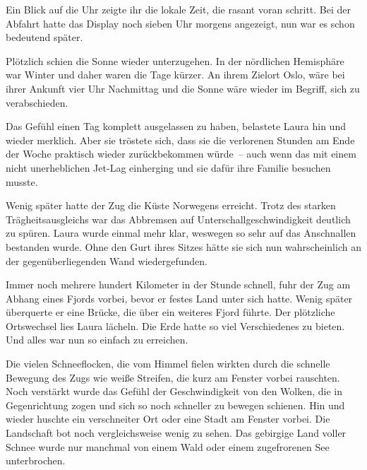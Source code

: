 \par

Ein Blick auf die Uhr zeigte ihr die lokale Zeit, die rasant voran schritt. Bei der Abfahrt hatte das Display noch sieben Uhr morgens angezeigt, nun war es schon bedeutend später.

\par

Plötzlich schien die Sonne wieder unterzugehen. In der nördlichen Hemisphäre war Winter und daher waren die Tage kürzer. An ihrem Zielort Oslo, wäre bei ihrer Ankunft vier Uhr Nachmittag und die Sonne wäre wieder im Begriff, sich zu verabschieden.

\par

Das Gefühl einen Tag komplett ausgelassen zu haben, belastete Laura hin und wieder merklich. Aber sie tröstete sich, dass sie die verlorenen Stunden am Ende der Woche praktisch wieder zurückbekommen würde~-- auch wenn das mit einem nicht unerheblichen Jet-Lag einherging und sie dafür ihre Familie besuchen musste.

\par

Wenig später hatte der Zug die Küste Norwegens erreicht. Trotz des starken Trägheitsausgleichs war das Abbremsen auf Unterschallgeschwindigkeit deutlich zu spüren. Laura wurde einmal mehr klar, weswegen so sehr auf das Anschnallen bestanden wurde. Ohne den Gurt ihres Sitzes hätte sie sich nun wahrscheinlich an der gegenüberliegenden Wand wiedergefunden.

\par

Immer noch mehrere hundert Kilometer in der Stunde schnell, fuhr der Zug am Abhang eines Fjords vorbei, bevor er festes Land unter sich hatte. Wenig später überquerte er eine Brücke, die über ein weiteres Fjord führte. Der plötzliche Ortswechsel lies Laura lächeln. Die Erde hatte so viel Verschiedenes zu bieten. Und alles war nun so einfach zu erreichen.

\par

Die vielen Schneeflocken, die vom Himmel fielen wirkten durch die schnelle Bewegung des Zugs wie weiße Streifen, die kurz am Fenster vorbei rauschten. Noch verstärkt wurde das Gefühl der Geschwindigkeit von den Wolken, die in Gegenrichtung zogen und sich so noch schneller zu bewegen schienen. Hin und wieder huschte ein verschneiter Ort oder eine Stadt am Fenster vorbei. Die Landschaft bot noch vergleichsweise wenig zu sehen. Das gebirgige Land voller Schnee wurde nur manchmal von einem Wald oder einem zugefrorenen See unterbrochen.

